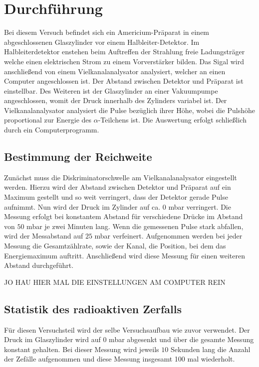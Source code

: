 \section{Durchführung}
\label{sec:Durchführung}
    Bei diesem Versuch befindet sich ein Americium-Präparat in einem abgeschlossenen Glaszylinder vor einem Halbleiter-Detektor.
    Im Halbleiterdetektor enstehen beim Auftreffen der Strahlung freie Ladungsträger welche einen elektrischen Strom zu einem Vorverstärker 
    bilden. Das Sigal wird anschließend von einem Vielkanalanalysator analysiert, welcher an einen Computer angeschlossen ist. Der Abstand
    zwischen Detektor und Präparat ist einstellbar. Des Weiteren ist der Glaszylinder an einer Vakuumpumpe angeschlossen, womit der Druck
    innerhalb des Zylinders variabel ist. Der Vielkanalanalysator analysiert die Pulse bezüglich ihrer Höhe, wobei die Pulshöhe proportional zur Energie
    des $\alpha$-Teilchens ist. Die Auswertung erfolgt schließlich durch ein Computerprogramm.
    \subsection{Bestimmung der Reichweite}
        Zunächst muss die Diskriminatorschwelle am Vielkanalanalysator eingestellt werden. Hierzu wird der Abstand zwischen Detektor und 
        Präparat auf ein Maximum gestellt und so weit verringert, dass der Detektor gerade Pulse aufnimmt. Nun wird der Druck im Zylinder
        auf ca. $0$ mbar verringert. Die Messung erfolgt bei konstantem Abstand für verschiedene Drücke im Abstand von $50$ mbar je zwei Minuten 
        lang. Wenn die gemessenen Pulse stark abfallen, wird der Messabstand auf $25$ mbar verfeinert. Aufgenommen werden bei jeder Messung
        die Gesamtzählrate, sowie der Kanal, die Position, bei dem das Energiemaximum auftritt. 
        Anschließend wird diese Messung für einen weiteren Abstand durchgeführt. 

        JO HAU HIER MAL DIE EINSTELLUNGEN AM COMPUTER REIN
    \subsection{Statistik des radioaktiven Zerfalls}    
        Für diesen Versuchsteil wird der selbe Versuchsaufbau wie zuvor verwendet. Der Druck im Glaszylinder wird auf $0$ mbar abgesenkt und über
        die gesamte Messung konstant gehalten. Bei dieser Messung wird jeweils $10$ Sekunden lang die Anzahl der Zefälle aufgenommen und diese Messung
        insgesamt 100 mal wiederholt.
